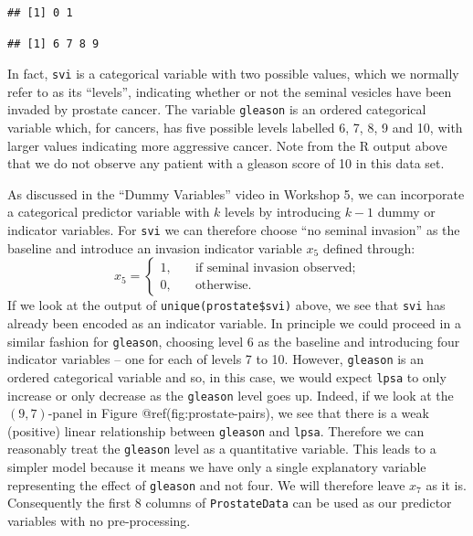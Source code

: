 \documentclass[
]{article}
\newenvironment{Shaded}{\begin{snugshade}}{\end{snugshade}}
\newcommand{\DocumentationTok}[1]{\textcolor[rgb]{0.56,0.35,0.01}{\textbf{\textit{#1}}}}
\newcommand{\FunctionTok}[1]{\textcolor[rgb]{0.13,0.29,0.53}{\textbf{#1}}}
\newcommand{\NormalTok}[1]{#1}
\newcommand{\SpecialCharTok}[1]{\textcolor[rgb]{0.81,0.36,0.00}{\textbf{#1}}}
\begin{document}
\begin{verbatim}
## [1] 0 1
\end{verbatim}

\begin{Shaded}
\end{Shaded}

\begin{verbatim}
## [1] 6 7 8 9
\end{verbatim}

In fact, \texttt{svi} is a categorical variable with two possible
values, which we normally refer to as its ``levels'', indicating whether
or not the seminal vesicles have been invaded by prostate cancer. The
variable \texttt{gleason} is an ordered categorical variable which, for
cancers, has five possible levels labelled 6, 7, 8, 9 and 10, with
larger values indicating more aggressive cancer. Note from the R output
above that we do not observe any patient with a gleason score of 10 in
this data set.

As discussed in the ``Dummy Variables'' video in Workshop 5, we can
incorporate a categorical predictor variable with \(k\) levels by
introducing \(k-1\) dummy or indicator variables. For \texttt{svi} we
can therefore choose ``no seminal invasion'' as the baseline and
introduce an invasion indicator variable \(x_{5}\) defined through:
\begin{equation*}
x_{5} = 
\begin{cases}
1, \quad &\text{if seminal invasion observed;}\\
0, \quad &\text{otherwise.}
\end{cases}
\end{equation*} If we look at the output of
\texttt{unique(prostate\$svi)} above, we see that \texttt{svi} has
already been encoded as an indicator variable. In principle we could
proceed in a similar fashion for \texttt{gleason}, choosing level 6 as
the baseline and introducing four indicator variables -- one for each of
levels 7 to 10. However, \texttt{gleason} is an ordered categorical
variable and so, in this case, we would expect \texttt{lpsa} to only
increase or only decrease as the \texttt{gleason} level goes up. Indeed,
if we look at the \((9,7)\)-panel in Figure @ref(fig:prostate-pairs), we
see that there is a weak (positive) linear relationship between
\texttt{gleason} and \texttt{lpsa}. Therefore we can reasonably treat
the \texttt{gleason} level as a quantitative variable. This leads to a
simpler model because it means we have only a single explanatory
variable representing the effect of \texttt{gleason} and not four. We
will therefore leave \(x_{7}\) as it is. Consequently the first 8
columns of \texttt{ProstateData} can be used as our predictor variables
with no pre-processing.
\end{document}
